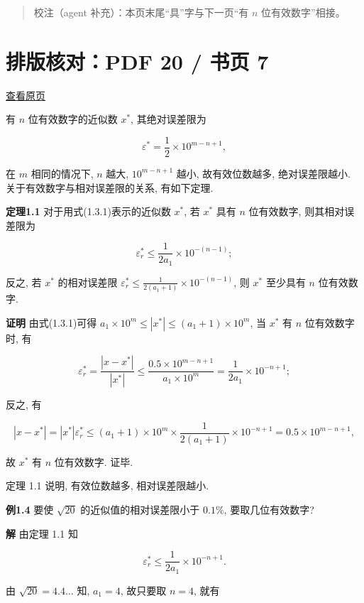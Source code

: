 \documentclass[
  10pt,
  a4paper,
]{article}
\begin{document}
\begin{quote}
校注（agent 补充）：本页末尾``具''字与下一页``有 \(n\)
位有效数字''相接。
\end{quote}

\newpage

\section{排版核对：PDF 20 / 书页
7}\label{ux6392ux7248ux6838ux5bf9pdf-20-ux4e66ux9875-7}

\href{../../../source-images/pdf-020.jpeg}{查看原页}

有 \(n\) 位有效数字的近似数 \(x^*\), 其绝对误差限为

\[
\varepsilon^* = \frac{1}{2} \times 10^{m-n+1},
\]

在 \(m\) 相同的情况下, \(n\) 越大, \(10^{m-n+1}\) 越小, 故有效位数越多,
绝对误差限越小. 关于有效数字与相对误差限的关系, 有如下定理.

\textbf{定理1.1} 对于用式(1.3.1)表示的近似数 \(x^*\), 若 \(x^*\) 具有
\(n\) 位有效数字, 则其相对误差限为

\[
\varepsilon_r^* \leqslant \frac{1}{2a_1} \times 10^{-(n-1)};
\]

反之, 若 \(x^*\) 的相对误差限
\(\varepsilon_r^* \leqslant \frac{1}{2(a_1+1)} \times 10^{-(n-1)}\), 则
\(x^*\) 至少具有 \(n\) 位有效数字.

\textbf{证明} 由式(1.3.1)可得
\(a_1 \times 10^m \leqslant |x^*| \leqslant (a_1+1) \times 10^m\), 当
\(x^*\) 有 \(n\) 位有效数字时, 有

\[
\varepsilon_r^* = \frac{|x-x^*|}{|x^*|} \leqslant \frac{0.5 \times 10^{m-n+1}}{a_1 \times 10^m} = \frac{1}{2a_1} \times 10^{-n+1};
\]

反之, 有

\[
|x-x^*| = |x^*| \varepsilon_r^* \leqslant (a_1+1) \times 10^m \times \frac{1}{2(a_1+1)} \times 10^{-n+1} = 0.5 \times 10^{m-n+1},
\]

故 \(x^*\) 有 \(n\) 位有效数字. 证毕.

定理 1.1 说明, 有效位数越多, 相对误差限越小.

\textbf{例1.4} 要使 \(\sqrt{20}\) 的近似值的相对误差限小于 \(0.1\%\),
要取几位有效数字?

\textbf{解} 由定理 1.1 知

\[
\varepsilon_r^* \leqslant \frac{1}{2a_1} \times 10^{-n+1}.
\]

由 \(\sqrt{20} = 4.4 \dots\) 知, \(a_1 = 4\), 故只要取 \(n=4\), 就有
\end{document}
